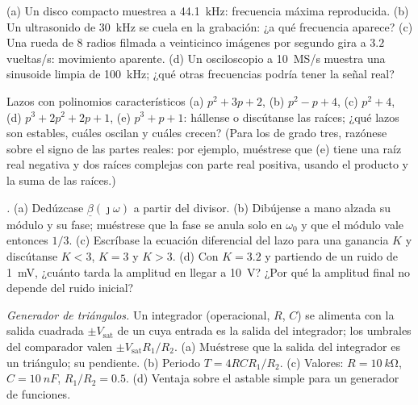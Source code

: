 \begin{exercise}[$\star$]\label{exo:b2:feedback-oscillators:4}
(a) Un disco compacto muestrea a \qty{44.1}{kHz}: frecuencia máxima
reproducida. (b) Un ultrasonido de \qty{30}{kHz} se cuela en la grabación:
¿a qué frecuencia aparece? (c) Una rueda de $8$ radios filmada a
veinticinco imágenes por segundo gira a $3.2$ vueltas/s: movimiento
aparente. (d) Un osciloscopio a \qty{10}{MS/s} muestra una sinusoide limpia
de \qty{100}{kHz}; ¿qué otras frecuencias podría tener la señal real?
\end{exercise}

\begin{exercise}[$\star\star$]\label{exo:b2:feedback-oscillators:5}
Lazos con polinomios característicos (a) $p^2 + 3p + 2$, (b) $p^2 - p +
4$, (c) $p^2 + 4$, (d) $p^3 + 2p^2 + 2p + 1$, (e) $p^3 + p + 1$: hállense o
discútanse las raíces; ¿qué lazos son estables, cuáles oscilan y cuáles
crecen? (Para los de grado tres, razónese sobre el signo de las partes
reales: por ejemplo, muéstrese que (e) tiene una raíz real negativa y dos
raíces complejas con parte real positiva, usando el producto y la suma de las raíces.)
\end{exercise}

\begin{exercise}[$\star\star$]\label{exo:b2:feedback-oscillators:6}
\emph{.} (a) Dedúzcase $\underline\beta(\jmath\omega)$ a partir del
divisor. (b) Dibújense a mano alzada su módulo y su fase; muéstrese que la
fase se anula solo en $\omega_0$ y que el módulo vale entonces $1/3$.
(c) Escríbase la ecuación diferencial del lazo para una ganancia $K$ y
discútanse $K < 3$, $K = 3$ y $K > 3$. (d) Con $K = 3.2$ y partiendo de un
ruido de \qty{1}{mV}, ¿cuánto tarda la amplitud en llegar a \qty{10}{V}?
¿Por qué la amplitud final no depende del ruido inicial?
\end{exercise}

\begin{exercise}[$\star\star$]\label{exo:b2:feedback-oscillators:7}
\emph{Generador de triángulos.} Un integrador (operacional, $R$, $C$) se
alimenta con la salida cuadrada $\pm V_{\text{sat}}$ de un  cuya entrada
es la salida del integrador; los umbrales del comparador valen
$\pm V_{\text{sat}}R_1/R_2$. (a) Muéstrese que la salida del integrador es un
triángulo; su pendiente. (b) Periodo $T = 4RCR_1/R_2$. (c) Valores: $R = \qty{10}{k\ohm}$,
$C = \qty{10}{nF}$, $R_1/R_2 = 0.5$. (d) Ventaja sobre el astable simple
para un generador de funciones.
\end{exercise}

